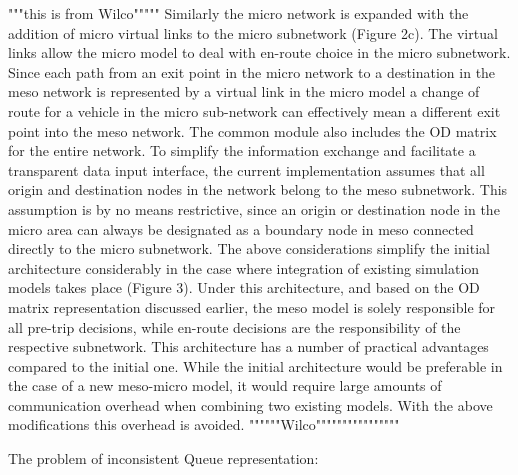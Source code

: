 \begin{bibunit}[plainnat]
"""this is from Wilco"""""
Similarly the micro network is expanded with the addition of micro virtual links to the
micro subnetwork (Figure 2c). The virtual links allow the micro model to deal with
en-route choice in the micro subnetwork. Since each path from an exit point in the
micro network to a destination in the meso network is represented by a virtual link
in the micro model a change of route for a vehicle in the micro sub-network can
effectively mean a different exit point into the meso network.
The common module also includes the OD matrix for the entire network. To
simplify the information exchange and facilitate a transparent data input interface,
the current implementation assumes that all origin and destination nodes in the
network belong to the meso subnetwork. This assumption is by no means
restrictive, since an origin or destination node in the micro area can always be
designated as a boundary node in meso connected directly to the micro
subnetwork.
The above considerations simplify the initial architecture considerably in the case
where integration of existing simulation models takes place (Figure 3). Under this
architecture, and based on the OD matrix representation discussed earlier, the meso
model is solely responsible for all pre-trip decisions, while en-route decisions are
the responsibility of the respective subnetwork. This architecture has a number of
practical advantages compared to the initial one. While the initial architecture would
be preferable in the case of a new meso-micro model, it would require large
amounts of communication overhead when combining two existing models. With
the above modifications this overhead is avoided.
""""""Wilco""""""""""""""""


The problem of inconsistent Queue representation:


\end{bibunit}
